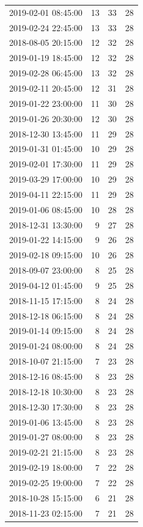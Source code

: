 \begin{tabular}{lrrr}
2019-02-01 08:45:00 & 13 & 33 & 28 \\
2019-02-24 22:45:00 & 13 & 33 & 28 \\
2018-08-05 20:15:00 & 12 & 32 & 28 \\
2019-01-19 18:45:00 & 12 & 32 & 28 \\
2019-02-28 06:45:00 & 13 & 32 & 28 \\
2019-02-11 20:45:00 & 12 & 31 & 28 \\
2019-01-22 23:00:00 & 11 & 30 & 28 \\
2019-01-26 20:30:00 & 12 & 30 & 28 \\
2018-12-30 13:45:00 & 11 & 29 & 28 \\
2019-01-31 01:45:00 & 10 & 29 & 28 \\
2019-02-01 17:30:00 & 11 & 29 & 28 \\
2019-03-29 17:00:00 & 10 & 29 & 28 \\
2019-04-11 22:15:00 & 11 & 29 & 28 \\
2019-01-06 08:45:00 & 10 & 28 & 28 \\
2018-12-31 13:30:00 & 9 & 27 & 28 \\
2019-01-22 14:15:00 & 9 & 26 & 28 \\
2019-02-18 09:15:00 & 10 & 26 & 28 \\
2018-09-07 23:00:00 & 8 & 25 & 28 \\
2019-04-12 01:45:00 & 9 & 25 & 28 \\
2018-11-15 17:15:00 & 8 & 24 & 28 \\
2018-12-18 06:15:00 & 8 & 24 & 28 \\
2019-01-14 09:15:00 & 8 & 24 & 28 \\
2019-01-24 08:00:00 & 8 & 24 & 28 \\
2018-10-07 21:15:00 & 7 & 23 & 28 \\
2018-12-16 08:45:00 & 8 & 23 & 28 \\
2018-12-18 10:30:00 & 8 & 23 & 28 \\
2018-12-30 17:30:00 & 8 & 23 & 28 \\
2019-01-06 13:45:00 & 8 & 23 & 28 \\
2019-01-27 08:00:00 & 8 & 23 & 28 \\
2019-02-21 21:15:00 & 8 & 23 & 28 \\
2019-02-19 18:00:00 & 7 & 22 & 28 \\
2019-02-25 19:00:00 & 7 & 22 & 28 \\
2018-10-28 15:15:00 & 6 & 21 & 28 \\
2018-11-23 02:15:00 & 7 & 21 & 28 \\

\end{tabular}
